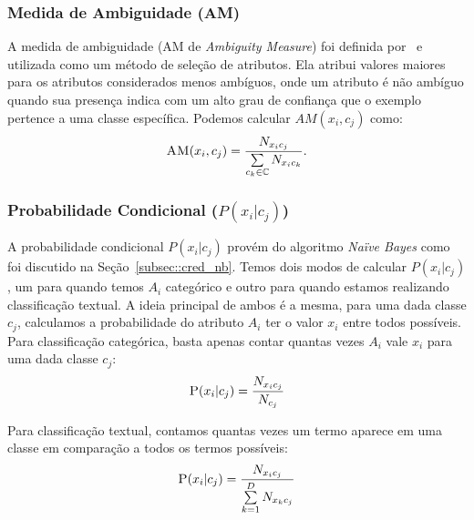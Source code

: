 \subsubsection{Medida de Ambiguidade (AM)}
\label{subsubsection::am}

A medida de ambiguidade (\textsc{AM} de \textit{Ambiguity Measure}) foi definida por~\cite{Mengle08} e utilizada como um método de seleção de atributos. Ela atribui valores maiores para os atributos considerados menos ambíguos, onde um atributo é não ambíguo quando sua presença indica com um alto grau de confiança que o exemplo pertence a uma classe específica. Podemos calcular $AM(x_i, c_j)$ como:
\begin{equation}\label{eqn::am}
 \textsc{AM}(x_i, c_j) = \frac{ N_{x_{i}c_{j}}}{\sum\limits_{c_k \in \mathbb{C}} N_{x_{i}c_{k}}}.
\end{equation}

\subsubsection{Probabilidade Condicional ($P(x_i|c_j)$)}
\label{subsubsection::pc}

A probabilidade condicional $P(x_i|c_j)$ provém do algoritmo \textit{Naïve Bayes} como foi discutido na Seção~\ref{subsec::cred_nb}.
Temos dois modos de calcular $P(x_i|c_j)$, um para quando temos $A_i$ categórico e outro para quando estamos realizando classificação textual.
A ideia principal de ambos é a mesma, para uma dada classe $c_j$, calculamos a probabilidade do atributo $A_i$ ter o valor $x_i$ entre todos possíveis. 
Para classificação categórica, basta apenas contar quantas vezes $A_i$ vale $x_i$ para uma dada classe $c_j$:
    \begin{equation}\label{eqn::nbcattexto}
        \textsc{P}(x_i|c_j) = \frac{ N_{x_{i}c_{j}} }{ N_{c_{j}} } 
    \end{equation}
        
Para classificação textual, contamos quantas vezes um termo aparece em uma classe em comparação a todos os termos possíveis:
    \begin{equation}\label{eqn::nbcattexto}
       \textsc{P}(x_i|c_j) = \frac{ N_{x_{i}c_{j}} }{ \sum\limits^{D}_{k = 1} {  N_{x_{k}c_{j}}} } 
    \end{equation}


